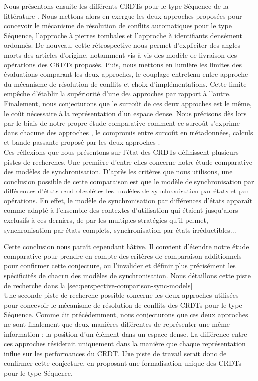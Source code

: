 Nous présentons ensuite les différents \acp{CRDT} pour le type Séquence de la littérature .
Nous mettons alors en exergue les deux approches proposées pour concevoir le mécanisme de résolution de conflits automatiques pour le type Séquence, \ie l'approche à pierres tombales et l'approche à identifiants densément ordonnés.
De nouveau, cette rétrospective nous permet d'expliciter des angles morts des articles d'origine, notamment vis-à-vis des modèle de livraison des opérations des \acp{CRDT} proposés.
Puis, nous mettons en lumière les limites des évaluations comparant les deux approches, \ie le couplage entretenu entre approche du mécanisme de résolution de conflits et choix d'implémentations.
Cette limite empêche d'établir la supériorité d'une des approches par rapport à l'autre.
Finalement, nous conjecturons que le surcoût de ces deux approches est le même, \ie le coût nécessaire à la représentation d'un espace dense.
Nous précisons dès lors par le biais de notre propre étude comparative comment ce surcoût s'exprime dans chacune des approches , \ie le compromis entre surcoût en métadonnées, calculs et bande-passante proposé par les deux approches .\\

Ces réflexions que nous présentons sur l'état des \acp{CRDT} définissent plusieurs pistes de recherches.
Une première d'entre elles concerne notre étude comparative des modèles de synchronisation.
D'après les critères que nous utilisons, une conclusion possible de cette comparaison est que le modèle de synchronisation par différences d'états rend obsolètes les modèles de synchronisation par états et par opérations.
En effet, le modèle de synchronisation par différences d'états apparaît comme adapté à l'ensemble des contextes d'utilisation qui étaient jusqu'alors exclusifs à ces derniers, de par les multiples stratégies qu'il permet, \eg synchronisation par états complets, synchronisation par états irréductibles...

Cette conclusion nous paraît cependant hâtive.
Il convient d'étendre notre étude comparative pour prendre en compte des critères de comparaison additionnels pour confirmer cette conjecture, ou l'invalider et définir plus précisément les spécificités de chacun des modèles de synchronisation.
Nous détaillons cette piste de recherche dans la \autoref{sec:perspective-comparison-sync-models}.\\

Une seconde piste de recherche possible concerne les deux approches utilisées pour concevoir le mécanisme de résolution de conflits des \acp{CRDT} pour le type Séquence.
Comme dit précédemment, nous conjecturons que ces deux approches ne sont finalement que deux manières différentes de représenter une même information : la position d'un élément dans un espace dense.
La différence entre ces approches résiderait uniquement dans la manière que chaque représentation influe sur les performances du \ac{CRDT}.
Une piste de travail serait donc de confirmer cette conjecture, en proposant une formalisation unique des \acp{CRDT} pour le type Séquence.
